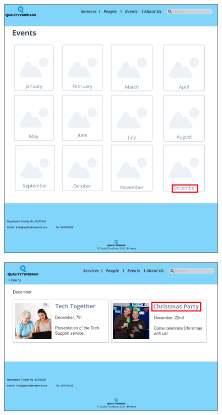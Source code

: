 \documentclass[a4paper, 11pt, parskip=half, headsepline]{scrreprt}
\begin{document}
\begin{figure}[H]
	\centering
	\includegraphics[width=1\linewidth, keepaspectratio]{scenarios/scenario-32}
	\caption{}
	\label{fig:scenario-32}
\end{figure}

\begin{figure}[H]
	\centering
	\includegraphics[width=1\linewidth, keepaspectratio]{scenarios/scenario-33}
	\caption{}
	\label{fig:scenario-33}
\end{figure}
\end{document}
